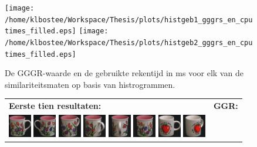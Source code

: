 \begin{figure}[tbp]
\begin{center}
\texttt{[image: /home/klbostee/Workspace/Thesis/plots/histgeb1\_gggrs\_en\_cputimes\_filled.eps]} 
\texttt{[image: /home/klbostee/Workspace/Thesis/plots/histgeb2\_gggrs\_en\_cputimes\_filled.eps]}
\caption{\label{fig:histgeb_gggrs_en_cputimes}De GGGR-waarde en de gebruikte rekentijd in ms voor elk van de similariteitsmaten op basis van histrogrammen.}
\end{center}
\end{figure}

\begin{figure}[tbp]
\begin{center}
\begin{tabular}{m{11cm} | m{3cm} |}
\textbf{Eerste tien resultaten:} & \textbf{GGR:} \\
\vspace{4pt}
\includegraphics[width=1cm]{coil/beeld-6.eps} 
\includegraphics[width=1cm]{coil/beeld-7.eps} 
\includegraphics[width=1cm]{coil/beeld-9.eps} 
\includegraphics[width=1cm]{coil/beeld-10.eps} 
\includegraphics[width=1cm]{coil/beeld-11.eps} 
\includegraphics[width=1cm]{coil/beeld-8.eps} 
\includegraphics[width=1cm]{coil/beeld-36.eps} 
\includegraphics[width=1cm]{coil/beeld-39.eps} 

\end{tabular}
\end{center}
\end{figure}
